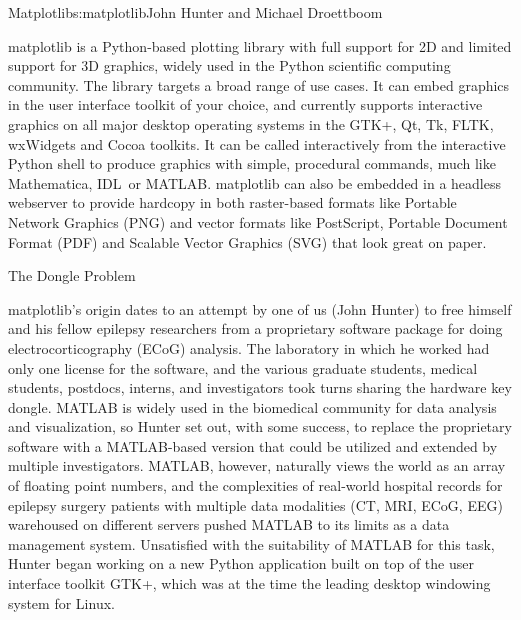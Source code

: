 \begin{aosachapter}{Matplotlib}{s:matplotlib}{John Hunter and Michael Droettboom}


matplotlib is a Python-based plotting library with full support for 
2D and limited support for 3D graphics, widely used in
the Python scientific computing community.  The library targets a broad range of
use cases.  It can embed graphics in the user interface toolkit of
your choice, and currently supports interactive graphics on all major
desktop operating systems in the GTK+, Qt, Tk, FLTK, wxWidgets and
Cocoa toolkits.  It can be called interactively from the
interactive Python shell to produce graphics with simple, procedural
commands, much like Mathematica\texttrademark, IDL\texttrademark\ or
MATLAB\texttrademark.  matplotlib can also be embedded in a headless
webserver to provide hardcopy in both raster-based formats like
Portable Network Graphics (PNG) and vector formats like
PostScript, Portable Document Format (PDF) and Scalable Vector
Graphics (SVG) that look great on paper.

\begin{aosasect1}{The Dongle Problem}

matplotlib's origin dates to an attempt by one of us (John Hunter) to
free himself and his fellow epilepsy researchers from a proprietary
software package for doing electrocorticography (ECoG) analysis.  The
laboratory in which he worked had only one license for the software,
and the various graduate students, medical students, postdocs, interns,
and investigators took turns sharing the hardware key dongle.
MATLAB is widely used in the biomedical community for
data analysis and visualization, so Hunter set out, with some success,
to replace the proprietary software with a MATLAB-based version that
could be utilized and extended by multiple investigators.  MATLAB,
however, naturally views the world as an array of floating point
numbers, and the complexities of real-world hospital records for
epilepsy surgery patients with multiple data modalities (CT, MRI,
ECoG, EEG) warehoused on different servers pushed MATLAB to its limits
as a data management system.  Unsatisfied with the suitability of
MATLAB for this task, Hunter began working on a new Python application
built on top of the user interface toolkit GTK+, which was at the time
the leading desktop windowing system for Linux.


\end{aosasect1}
\end{aosachapter}
